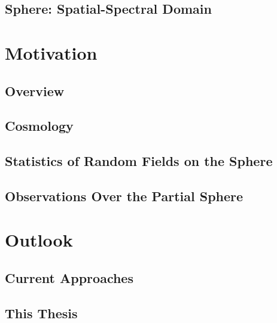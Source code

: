 \subsection{Sphere: Spatial-Spectral Domain}\label{sec:chapter2_slepian_sphere}







\section{Motivation}

\subsection{Overview}

\subsection{Cosmology}





\subsection{Statistics of Random Fields on the Sphere}

\subsection{Observations Over the Partial Sphere}

\section{Outlook}

\subsection{Current Approaches}

\subsection{This Thesis}

